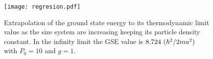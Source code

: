 \documentclass[twocolumn,showpacs,showkeys,preprintnumbers,superscriptaddress, pra, 10pt, aps]{revtex4-2}
\begin{document}
%









\begin{figure}[H]
  \texttt{[image: regresion.pdf]}
  \caption{%
    Extrapolation of the ground state energy to its thermodynamic limit value as the size system are increasing keeping its particle density constant. In the infinity limit the GSE value is $8{\mbox .}724 \ (\hbar^2/2ma^2) $ with $P_0=10$ and $g=1$.}
  \label{fig:regresion}
\end{figure}
\end{document}
